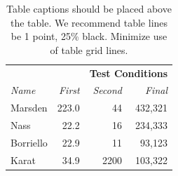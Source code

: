 \documentclass[sigchi-a, authorversion]{acmart}
\begin{document}
\begin{table}
  \caption{Table captions should be placed above the table. We
    recommend table lines be 1 point, 25\% black. Minimize use of
    table grid lines.}
  \label{tab:table1}
  \begin{tabular}{l r r r}
    & & \multicolumn{2}{c}{\small{\textbf{Test Conditions}}} \\
    \cmidrule(r){3-4}
    {\small\textit{Name}}
    & {\small \textit{First}}
      & {\small \textit{Second}}
    & {\small \textit{Final}} \\
    \midrule
    Marsden & 223.0 & 44 & 432,321 \\
    Nass & 22.2 & 16 & 234,333 \\
    Borriello & 22.9 & 11 & 93,123 \\
    Karat & 34.9 & 2200 & 103,322 \\
     \bottomrule
  \end{tabular}
\end{table}
\end{document}
